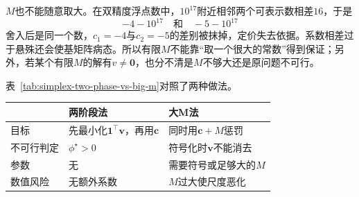 $M$也不能随意取大。在双精度浮点数中，$10^{17}$附近相邻两个可表示数相差$16$，于是
\[
 -4-10^{17}\quad\text{和}\quad-5-10^{17}
\]
舍入后是同一个数，$c_1=-4$与$c_2=-5$的差别被抹掉，定价失去依据。系数相差过于悬殊还会使基矩阵病态。所以有限$M$不能靠“取一个很大的常数”得到保证；另外，若某个有限$M$的解有$v\neq\bm{0}$，也分不清是$M$不够大还是原问题不可行。

表~\ref{tab:simplex-two-phase-vs-big-m}对照了两种做法。

\begin{BookInlineTable}
 \centering
 \begin{tabular}{lll}
  \toprule
  & 两阶段法 & 大M法\\
  \midrule
  目标 & 先最小化$\bm{1}^\top\bm{v}$，再用$\bm{c}$ & 同时用$\bm{c}+M$惩罚\\
  不可行判定 & $\phi^\star>0$ & 符号化时$\bm{v}$不能消去\\
  参数 & 无 & 需要符号或足够大的$M$\\
  数值风险 & 无额外系数 & $M$过大使尺度恶化\\
  \bottomrule
 \end{tabular}
 \caption{两阶段法与大M法的对照。}
 \label{tab:simplex-two-phase-vs-big-m}
\end{BookInlineTable}
